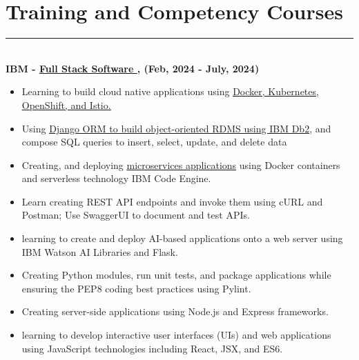 \documentclass[12pt]{article}
\begin{document}
\vspace{-5mm}\section*{\fontsize{14}{1}\selectfont\color{color_29791}Training and Competency Courses}\vspace{-9pt} 
\rule{\textwidth}{0.4pt}
\vspace{2pt}
\\\textbf{IBM - \href{https://coursera.org/share/a352ad6b5eef1f6443a48a21e561add4}{\underline{Full Stack Software }}, (Feb, 2024 - July, 2024)}
\vspace{-3mm}
\begin{itemize}
  \item Learning to build cloud native applications using \href{https://coursera.org/share/5705b6b914c0600090105451c32dd8d0}{\underline{Docker, Kubernetes, OpenShift, and Istio.}}
  \vspace{-3mm}
  \item Using \href{https://coursera.org/share/069696f4c4cbb78e2c12acb663c4a1ee}{\underline{Django ORM to build object-oriented RDMS using IBM Db2}}, and compose SQL queries to insert, select, update, and delete data
  \vspace{-3mm}
  \item Creating, and deploying \href{https://coursera.org/share/dea435400069b14cf6579a09dce472ac}{\underline{microservices applications}} using Docker containers and serverless technology IBM Code Engine.
  \vspace{-3mm}
  \item Learn creating REST API endpoints and invoke them using cURL and Postman; Use SwaggerUI to document and test APIs.
   \vspace{-3mm}
  \item learning to create and deploy AI-based applications onto a web server using IBM Watson AI Libraries and Flask.
  \vspace{-3mm}
  \item Creating Python modules, run unit tests, and package applications while ensuring the PEP8 coding best practices using Pylint.
  \vspace{-3mm}
  \item Creating server-side applications using Node.js and Express frameworks.
  \vspace{-3mm}
  \item learning to develop interactive user interfaces (UIs) and web applications using JavaScript technologies including React, JSX, and ES6.
\end{itemize}
\end{document}
